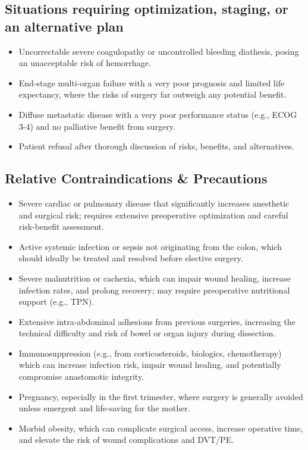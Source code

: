 \subsection*{Situations requiring optimization, staging, or an alternative plan}
\begin{itemize}
  \item Uncorrectable severe coagulopathy or uncontrolled bleeding diathesis, posing an unacceptable risk of hemorrhage.
  \item End-stage multi-organ failure with a very poor prognosis and limited life expectancy, where the risks of surgery far outweigh any potential benefit.
  \item Diffuse metastatic disease with a very poor performance status (e.g., ECOG 3-4) and no palliative benefit from surgery.
  \item Patient refusal after thorough discussion of risks, benefits, and alternatives.
\end{itemize}

\subsection*{Relative Contraindications \& Precautions}
\begin{itemize}
  \item Severe cardiac or pulmonary disease that significantly increases anesthetic and surgical risk; requires extensive preoperative optimization and careful risk-benefit assessment.
  \item Active systemic infection or sepsis not originating from the colon, which should ideally be treated and resolved before elective surgery.
  \item Severe malnutrition or cachexia, which can impair wound healing, increase infection rates, and prolong recovery; may require preoperative nutritional support (e.g., TPN).
  \item Extensive intra-abdominal adhesions from previous surgeries, increasing the technical difficulty and risk of bowel or organ injury during dissection.
  \item Immunosuppression (e.g., from corticosteroids, biologics, chemotherapy) which can increase infection risk, impair wound healing, and potentially compromise anastomotic integrity.
  \item Pregnancy, especially in the first trimester, where surgery is generally avoided unless emergent and life-saving for the mother.
  \item Morbid obesity, which can complicate surgical access, increase operative time, and elevate the risk of wound complications and DVT/PE.
\end{itemize}

